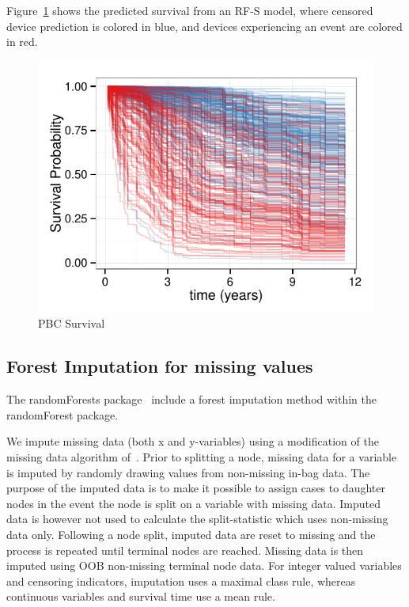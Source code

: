 \documentclass[nojss]{jss}\usepackage[]{graphicx}\usepackage[]{color}
\makeatletter
\def\maxwidth{ %
  \ifdim\Gin@nat@width>\linewidth
    \linewidth
  \else
    \Gin@nat@width
  \fi
}
\makeatother
\begin{document}
Figure~\ref{fig:rfsrc-plot} shows the predicted survival from an RF-S model, where censored device prediction is colored in blue, and devices experiencing an event are colored in red. 
\begin{Schunk}
\begin{figure}[!htpb]

{\centering \includegraphics[width=\maxwidth]{figure/rfs-rfsrc-plot-1} 

}

\caption[PBC Survival]{PBC Survival\label{fig:rfsrc-plot}}
\end{figure}
\end{Schunk}

\subsection{Forest Imputation for missing values}\label{S:imputation}

The randomForests package~\citep{liaw:2002} include a forest imputation method within the randomForest package. 

We impute missing data (both x and y-variables) using a modification of the missing data algorithm of~\cite{Ishwaran:2008}. Prior to splitting a node, missing data for a variable is imputed by randomly drawing values from non-missing in-bag data. The purpose of the imputed data is to make it possible to assign cases to daughter nodes in the event the node is split on a variable with missing data. Imputed data is however not used to calculate the split-statistic which uses non-missing data only. Following a node split, imputed data are reset to missing and the process is repeated until terminal nodes are reached. Missing data is then imputed using OOB non-missing terminal node data. For integer valued variables and censoring indicators, imputation uses a maximal class rule, whereas continuous variables and survival time use a mean rule.
\end{document}
